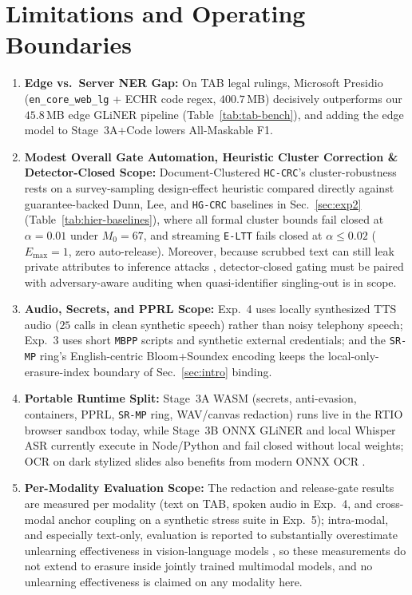 \documentclass{article}
\begin{document}
\section{Limitations and Operating Boundaries}
\label{sec:limitations}

\begin{enumerate}
    \item \textbf{Edge vs.\ Server NER Gap:} On TAB legal rulings, Microsoft Presidio (\texttt{en\_core\_web\_lg} + ECHR code regex, $400.7$\,MB) decisively outperforms our $45.8$\,MB edge GLiNER pipeline (Table~\ref{tab:tab-bench}), and adding the edge model to Stage~3A+Code lowers All-Maskable F1.
    \item \textbf{Modest Overall Gate Automation, Heuristic Cluster Correction \& Detector-Closed Scope:} Document-Clustered \texttt{HC-CRC}'s cluster-robustness rests on a survey-sampling design-effect heuristic compared directly against guarantee-backed Dunn, Lee, and \texttt{HG-CRC} baselines in Sec.~\ref{sec:exp2} (Table~\ref{tab:hier-baselines}), where all formal cluster bounds fail closed at $\alpha{=}0.01$ under $M_0{=}67$, and streaming \texttt{E-LTT} fails closed at $\alpha \le 0.02$ ($E_{\max}{=}1$, zero auto-release). Moreover, because scrubbed text can still leak private attributes to inference attacks \citep{lukas2023pii,staab2024beyond}, detector-closed gating must be paired with adversary-aware auditing \citep{cpa2026auditing} when quasi-identifier singling-out is in scope.
    \item \textbf{Audio, Secrets, and PPRL Scope:} Exp.~4 uses locally synthesized TTS audio ($25$ calls in clean synthetic speech) rather than noisy telephony speech; Exp.~3 uses short \texttt{MBPP} scripts and synthetic external credentials; and the \texttt{SR-MP} ring's English-centric Bloom+Soundex encoding keeps the local-only-erasure-index boundary of Sec.~\ref{sec:intro} binding.
    \item \textbf{Portable Runtime Split:} Stage~3A WASM (secrets, anti-evasion, containers, PPRL, \texttt{SR-MP} ring, WAV/canvas redaction) runs live in the RTIO browser sandbox today, while Stage~3B ONNX GLiNER and local Whisper ASR currently execute in Node/Python and fail closed without local weights; OCR on dark stylized slides also benefits from modern ONNX OCR \citep{cui2025paddleocr,ibm2025granitedocling}.
    \item \textbf{Per-Modality Evaluation Scope:} The redaction and release-gate results are measured per modality (text on TAB, spoken audio in Exp.~4, and cross-modal anchor coupling on a synthetic stress suite in Exp.~5); intra-modal, and especially text-only, evaluation is reported to substantially overestimate unlearning effectiveness in vision-language models \citep{unlinkvl2026}, so these measurements do not extend to erasure inside jointly trained multimodal models, and no unlearning effectiveness is claimed on any modality here.
\end{enumerate}
\end{document}

